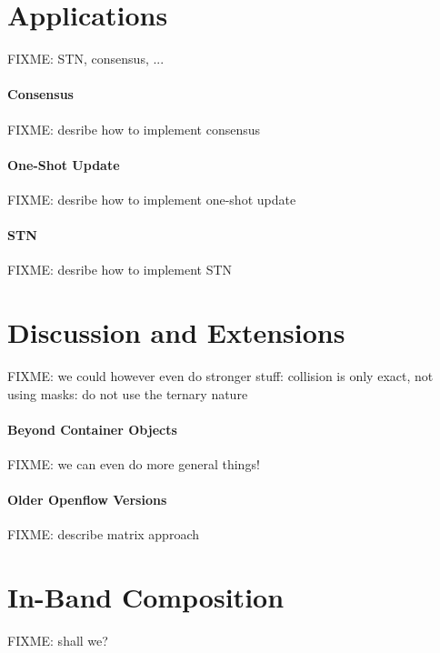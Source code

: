 \documentclass[conference]{sigcomm-alternate}
\begin{document}
\section{Applications}\label{sec:apps}

FIXME: STN, consensus, ...

\paragraph{Consensus} FIXME: desribe how to implement consensus

\paragraph{One-Shot Update} FIXME: desribe how to implement one-shot update

\paragraph{STN} FIXME: desribe how to implement STN

\section{Discussion and Extensions}\label{sec:discussion}

FIXME: we could however even do stronger stuff: collision is only exact, not using masks: do not use the ternary nature

\paragraph{Beyond Container Objects}
FIXME: we can even do more general things!

\paragraph{Older Openflow Versions} FIXME: describe matrix approach

\section{In-Band Composition}\label{sec:compo}

FIXME: shall we?
\end{document}
